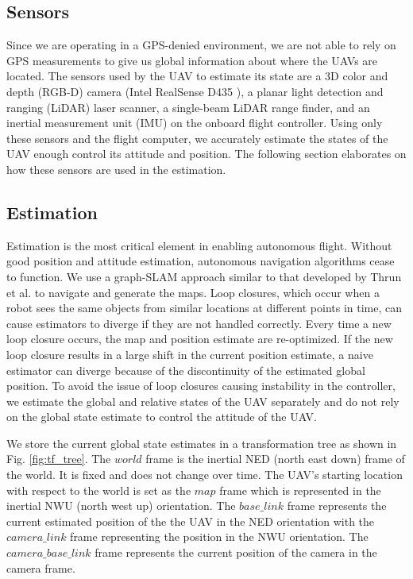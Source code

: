 \documentclass[letterpaper, 10 pt, conference]{ieeeconf}  %
\begin{document}
\subsection{Sensors}

Since we are operating in a GPS-denied environment, we are not able to rely on GPS measurements to give us global information about where the UAVs are located. The sensors used by the UAV to estimate its state are a 3D color and depth (RGB-D) camera (Intel RealSense D435 \cite{Intel}), a planar light detection and ranging (LiDAR) laser scanner, a single-beam LiDAR range finder, and an inertial measurement unit (IMU) on the onboard flight controller. Using only these sensors and the flight computer, we accurately estimate the states of the UAV enough control its attitude and position. The following section elaborates on how these sensors are used in the estimation.

\subsection{Estimation}

Estimation is the most critical element in enabling autonomous flight. Without good position and attitude estimation, autonomous navigation algorithms cease to function. We use a graph-SLAM approach similar to that developed by Thrun et al. \cite{Thrun2006} to navigate and generate the maps. Loop closures, which occur when a robot sees the same objects from similar locations at different points in time, can cause estimators to diverge if they are not handled correctly. Every time a new loop closure occurs, the map and position estimate are re-optimized. If the new loop closure results in a large shift in the current position estimate, a naive estimator can diverge because of the discontinuity of the estimated global position. To avoid the issue of loop closures causing instability in the controller, we estimate the global and relative states of the UAV separately and do not rely on the global state estimate to control the attitude of the UAV.

We store the current global state estimates in a transformation tree as shown in Fig. \ref{fig:tf_tree}. The $\mathit{world}$ frame is the inertial NED (north east down) frame of the world. It is fixed and does not change over time. The UAV's starting location with respect to the world is set as the $\mathit{map}$ frame which is represented in the inertial NWU (north west up) orientation. The $\mathit{base\_link}$ frame represents the current estimated position of the the UAV in the NED orientation with the $\mathit{camera\_link}$ frame representing the position in the NWU orientation. The $\mathit{camera\_base\_link}$ frame represents the current position of the camera in the camera frame.
\end{document}
